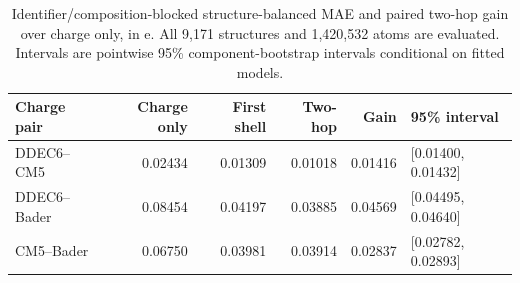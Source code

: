 \begin{table}[!htbp]
\centering\small
\caption{Identifier/composition-blocked structure-balanced MAE and paired two-hop gain over charge only, in e. All 9,171 structures and 1,420,532 atoms are evaluated. Intervals are pointwise 95\% component-bootstrap intervals conditional on fitted models.}
\label{tab:main}
\setlength{\tabcolsep}{3pt}
\begin{tabular}{lrrrrl}
\toprule
Charge pair & Charge only & First shell & Two-hop & Gain & 95\% interval \\
\midrule
DDEC6--CM5 & 0.02434 & 0.01309 & 0.01018 & 0.01416 & [0.01400, 0.01432] \\
DDEC6--Bader & 0.08454 & 0.04197 & 0.03885 & 0.04569 & [0.04495, 0.04640] \\
CM5--Bader & 0.06750 & 0.03981 & 0.03914 & 0.02837 & [0.02782, 0.02893] \\
\bottomrule
\end{tabular}
\end{table}
